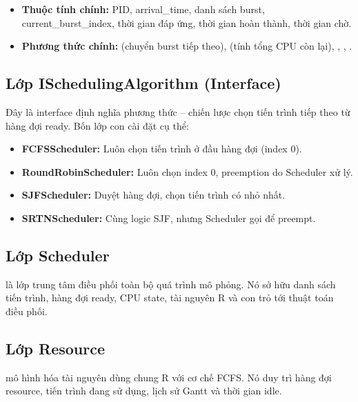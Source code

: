 \begin{itemize}
    \item \textbf{Thuộc tính chính:} PID, arrival\_time, danh sách burst, current\_burst\_index, thời gian đáp ứng, thời gian hoàn thành, thời gian chờ.
    \item \textbf{Phương thức chính:}  (chuyển burst tiếp theo), \linebreak[4] (tính tổng CPU còn lại), , , .
\end{itemize}

\subsection{Lớp ISchedulingAlgorithm (Interface)}

Đây là interface định nghĩa phương thức  -- chiến lược chọn tiến trình tiếp theo từ hàng đợi ready. Bốn lớp con cài đặt cụ thể:

\begin{itemize}
    \item \textbf{FCFSScheduler:} Luôn chọn tiến trình ở đầu hàng đợi (index 0).
    \item \textbf{RoundRobinScheduler:} Luôn chọn index 0, preemption do Scheduler xử lý.
    \item \textbf{SJFScheduler:} Duyệt hàng đợi, chọn tiến trình có  nhỏ nhất.
    \item \textbf{SRTNScheduler:} Cùng logic SJF, nhưng Scheduler gọi  để preempt.
\end{itemize}

\subsection{Lớp Scheduler}

 là lớp trung tâm điều phối toàn bộ quá trình mô phỏng. Nó sở hữu danh sách tiến trình, hàng đợi ready, CPU state, tài nguyên R và con trỏ tới thuật toán điều phối.

\subsection{Lớp Resource}

 mô hình hóa tài nguyên dùng chung R với cơ chế FCFS. Nó duy trì hàng đợi resource, tiến trình đang sử dụng, lịch sử Gantt và thời gian idle.

